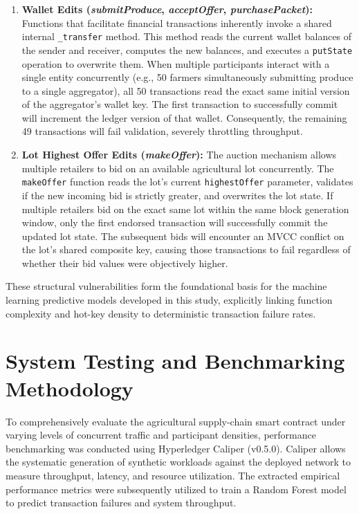 \documentclass[manuscript,screen,nofonts]{acmart}
\begin{document}
\begin{enumerate}
    \item \textbf{Wallet Edits (\textit{submitProduce}, \textit{acceptOffer}, \textit{purchasePacket}):} Functions that facilitate financial transactions inherently invoke a shared internal \texttt{\_transfer} method. This method reads the current wallet balances of the sender and receiver, computes the new balances, and executes a \texttt{putState} operation to overwrite them. When multiple participants interact with a single entity concurrently (e.g., 50 farmers simultaneously submitting produce to a single aggregator), all 50 transactions read the exact same initial version of the aggregator's wallet key. The first transaction to successfully commit will increment the ledger version of that wallet. Consequently, the remaining 49 transactions will fail validation, severely throttling throughput.
    
    \item \textbf{Lot Highest Offer Edits (\textit{makeOffer}):} The auction mechanism allows multiple retailers to bid on an available agricultural lot concurrently. The \texttt{makeOffer} function reads the lot's current \texttt{highestOffer} parameter, validates if the new incoming bid is strictly greater, and overwrites the lot state. If multiple retailers bid on the exact same lot within the same block generation window, only the first endorsed transaction will successfully commit the updated lot state. The subsequent bids will encounter an MVCC conflict on the lot's shared composite key, causing those transactions to fail regardless of whether their bid values were objectively higher.
\end{enumerate}

These structural vulnerabilities form the foundational basis for the machine learning predictive models developed in this study, explicitly linking function complexity and hot-key density to deterministic transaction failure rates.


\section{System Testing and Benchmarking Methodology}
To comprehensively evaluate the agricultural supply-chain smart contract under varying levels of concurrent traffic and participant densities, performance benchmarking was conducted using Hyperledger Caliper (v0.5.0). Caliper allows the systematic generation of synthetic workloads against the deployed network to measure throughput, latency, and resource utilization. The extracted empirical performance metrics were subsequently utilized to train a Random Forest model to predict transaction failures and system throughput.
\end{document}
